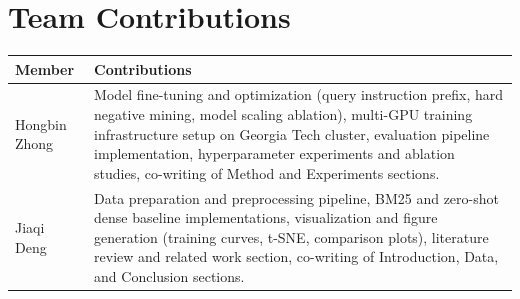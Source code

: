 \documentclass{article} %
\begin{document}
\section*{Team Contributions}

\begin{table}[h]
    \centering
    \scriptsize
    \begin{tabular}{lp{10cm}}
        \toprule
        Member & Contributions \\
        \midrule
        Hongbin Zhong & Model fine-tuning and optimization (query instruction prefix, hard negative mining, model scaling ablation), multi-GPU training infrastructure setup on Georgia Tech cluster, evaluation pipeline implementation, hyperparameter experiments and ablation studies, co-writing of Method and Experiments sections. \\
        \midrule
        Jiaqi Deng & Data preparation and preprocessing pipeline, BM25 and zero-shot dense baseline implementations, visualization and figure generation (training curves, t-SNE, comparison plots), literature review and related work section, co-writing of Introduction, Data, and Conclusion sections. \\
        \bottomrule
    \end{tabular}
\end{table}



\end{document}
